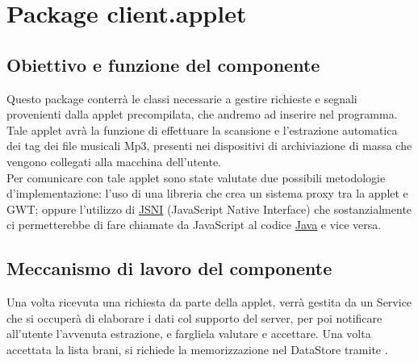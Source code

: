 \section{Package client.applet} %
\subsection*{Obiettivo e funzione del componente}
Questo package conterr\`a le classi necessarie a gestire richieste e segnali
provenienti dalla applet precompilata, che andremo ad inserire nel programma.
Tale applet avr\`a la funzione di effettuare la scansione e l'estrazione
automatica dei tag dei file musicali Mp3, presenti nei dispositivi di
archiviazione di massa che vengono collegati alla macchina dell'utente.\\
Per comunicare con tale applet sono state valutate due possibili metodologie
d'implementazione: l'uso di una libreria che crea un sistema proxy tra la applet
e GWT; oppure l'utilizzo di \underline{JSNI} (JavaScript Native Interface) che
sostanzialmente ci permetterebbe di fare chiamate da JavaScript al codice
\underline{Java} e vice versa.

\subsection*{Meccanismo di lavoro del componente}
Una volta ricevuta una richiesta da parte della applet, verr\`a gestita da un
Service che si occuper\`a di elaborare i dati col supporto del server, per poi
notificare all'utente l'avvenuta estrazione, e fargliela valutare e accettare.
Una volta accettata la lista brani, si richiede la memorizzazione nel DataStore
tramite .


\newpage
